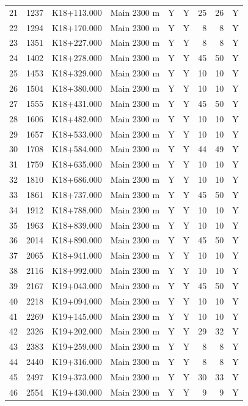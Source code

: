 \begin{longtable}{rrllccrrc}
21 & 1237 & K18+113.000 & Main 2300 m & Y & Y & 25 & 26 & Y \\
22 & 1294 & K18+170.000 & Main 2300 m & Y & Y & 8 & 8 & Y \\
23 & 1351 & K18+227.000 & Main 2300 m & Y & Y & 8 & 8 & Y \\
24 & 1402 & K18+278.000 & Main 2300 m & Y & Y & 45 & 50 & Y \\
25 & 1453 & K18+329.000 & Main 2300 m & Y & Y & 10 & 10 & Y \\
26 & 1504 & K18+380.000 & Main 2300 m & Y & Y & 10 & 10 & Y \\
27 & 1555 & K18+431.000 & Main 2300 m & Y & Y & 45 & 50 & Y \\
28 & 1606 & K18+482.000 & Main 2300 m & Y & Y & 10 & 10 & Y \\
29 & 1657 & K18+533.000 & Main 2300 m & Y & Y & 10 & 10 & Y \\
30 & 1708 & K18+584.000 & Main 2300 m & Y & Y & 44 & 49 & Y \\
31 & 1759 & K18+635.000 & Main 2300 m & Y & Y & 10 & 10 & Y \\
32 & 1810 & K18+686.000 & Main 2300 m & Y & Y & 10 & 10 & Y \\
33 & 1861 & K18+737.000 & Main 2300 m & Y & Y & 45 & 50 & Y \\
34 & 1912 & K18+788.000 & Main 2300 m & Y & Y & 10 & 10 & Y \\
35 & 1963 & K18+839.000 & Main 2300 m & Y & Y & 10 & 10 & Y \\
36 & 2014 & K18+890.000 & Main 2300 m & Y & Y & 45 & 50 & Y \\
37 & 2065 & K18+941.000 & Main 2300 m & Y & Y & 10 & 10 & Y \\
38 & 2116 & K18+992.000 & Main 2300 m & Y & Y & 10 & 10 & Y \\
39 & 2167 & K19+043.000 & Main 2300 m & Y & Y & 45 & 50 & Y \\
40 & 2218 & K19+094.000 & Main 2300 m & Y & Y & 10 & 10 & Y \\
41 & 2269 & K19+145.000 & Main 2300 m & Y & Y & 10 & 10 & Y \\
42 & 2326 & K19+202.000 & Main 2300 m & Y & Y & 29 & 32 & Y \\
43 & 2383 & K19+259.000 & Main 2300 m & Y & Y & 8 & 8 & Y \\
44 & 2440 & K19+316.000 & Main 2300 m & Y & Y & 8 & 8 & Y \\
45 & 2497 & K19+373.000 & Main 2300 m & Y & Y & 30 & 33 & Y \\
46 & 2554 & K19+430.000 & Main 2300 m & Y & Y & 9 & 9 & Y \\

\end{longtable}
